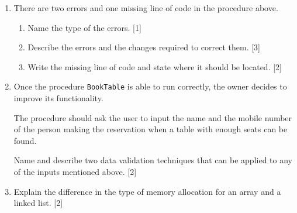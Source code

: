 \begin{enumerate}
\item There are two errors and one missing line of code in the procedure
above.
\begin{enumerate}
\item Name the type of the errors. \hfill{}{[}1{]}
\item Describe the errors and the changes required to correct them. \hfill{}{[}3{]}
\item Write the missing line of code and state where it should be located.
\hfill{}{[}2{]}
\end{enumerate}
\item Once the procedure \texttt{BookTable} is able to run correctly, the
owner decides to improve its functionality.

The procedure should ask the user to input the name and the mobile
number of the person making the reservation when a table with enough
seats can be found.

Name and describe two data validation techniques that can be applied
to any of the inputs mentioned above.\hfill{} {[}2{]}
\item Explain the difference in the type of memory allocation for an array
and a linked list. \hfill{}{[}2{]}
\end{enumerate}